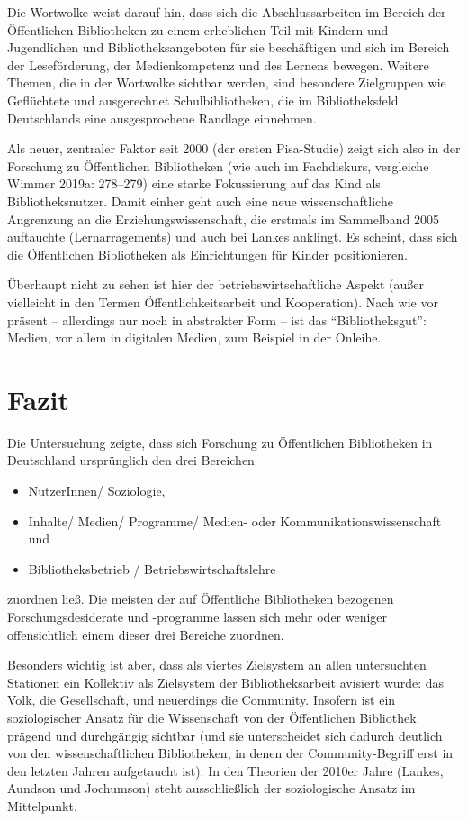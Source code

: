 \documentclass[a4paper,
fontsize=11pt,
oneside,
numbers=noperiodatend,
parskip=half-,
bibliography=totoc,
final
]{scrartcl}
\begin{document}
Die Wortwolke weist darauf hin, dass sich die Abschlussarbeiten im
Bereich der Öffentlichen Bibliotheken zu einem erheblichen Teil mit
Kindern und Jugendlichen und Bibliotheksangeboten für sie beschäftigen
und sich im Bereich der Leseförderung, der Medienkompetenz und des
Lernens bewegen. Weitere Themen, die in der Wortwolke sichtbar werden,
sind besondere Zielgruppen wie Geflüchtete und ausgerechnet
Schulbibliotheken, die im Bibliotheksfeld Deutschlands eine
ausgesprochene Randlage einnehmen.

Als neuer, zentraler Faktor seit 2000 (der ersten Pisa-Studie) zeigt
sich also in der Forschung zu Öffentlichen Bibliotheken (wie auch im
Fachdiskurs, vergleiche Wimmer 2019a: 278--279) eine starke Fokussierung
auf das Kind als Bibliotheksnutzer. Damit einher geht auch eine neue
wissenschaftliche Angrenzung an die Erziehungswissenschaft, die erstmals
im Sammelband 2005 auftauchte (Lernarragements) und auch bei Lankes
anklingt. Es scheint, dass sich die Öffentlichen Bibliotheken als
Einrichtungen für Kinder positionieren.

Überhaupt nicht zu sehen ist hier der betriebswirtschaftliche Aspekt
(außer vielleicht in den Termen Öffentlichkeitsarbeit und Kooperation).
Nach wie vor präsent -- allerdings nur noch in abstrakter Form -- ist
das \enquote{Bibliotheksgut}: Medien, vor allem in digitalen Medien, zum
Beispiel in der Onleihe.

\hypertarget{fazit}{%
\section{Fazit}\label{fazit}}

Die Untersuchung zeigte, dass sich Forschung zu Öffentlichen
Bibliotheken in Deutschland ursprünglich den drei Bereichen

\begin{itemize}
\item
  NutzerInnen/ Soziologie,
\item
  Inhalte/ Medien/ Programme/ Medien- oder Kommunikationswissenschaft
  und
\item
  Bibliotheksbetrieb / Betriebswirtschaftslehre
\end{itemize}

zuordnen ließ. Die meisten der auf Öffentliche Bibliotheken bezogenen
Forschungsdesiderate und -programme lassen sich mehr oder weniger
offensichtlich einem dieser drei Bereiche zuordnen.

Besonders wichtig ist aber, dass als viertes Zielsystem an allen
untersuchten Stationen ein Kollektiv als Zielsystem der
Bibliotheksarbeit avisiert wurde: das Volk, die Gesellschaft, und
neuerdings die Community. Insofern ist ein soziologischer Ansatz für die
Wissenschaft von der Öffentlichen Bibliothek prägend und durchgängig
sichtbar (und sie unterscheidet sich dadurch deutlich von den
wissenschaftlichen Bibliotheken, in denen der Community-Begriff erst in
den letzten Jahren aufgetaucht ist). In den Theorien der 2010er Jahre
(Lankes, Aundson und Jochumson) steht ausschließlich der soziologische
Ansatz im Mittelpunkt.
\end{document}
